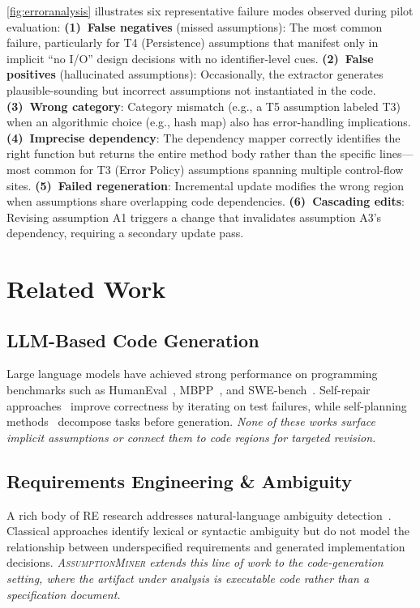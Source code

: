 \documentclass[sigconf,review,anonymous]{acmart}
\newcommand{\sysname}{\textsc{AssumptionMiner}\xspace}
\begin{document}
\cref{fig:erroranalysis} illustrates six representative failure modes observed
during pilot evaluation:
\textbf{(1)~False negatives} (missed assumptions): The most common failure, particularly
for T4 (Persistence) assumptions that manifest only in implicit ``no I/O'' design
decisions with no identifier-level cues.
\textbf{(2)~False positives} (hallucinated assumptions): Occasionally, the extractor
generates plausible-sounding but incorrect assumptions not instantiated in the code.
\textbf{(3)~Wrong category}: Category mismatch (e.g., a T5 assumption labeled T3)
when an algorithmic choice (e.g., hash map) also has error-handling implications.
\textbf{(4)~Imprecise dependency}: The dependency mapper correctly identifies the
right function but returns the entire method body rather than the specific
lines—most common for T3 (Error Policy) assumptions spanning multiple control-flow sites.
\textbf{(5)~Failed regeneration}: Incremental update modifies the wrong region
when assumptions share overlapping code dependencies.
\textbf{(6)~Cascading edits}: Revising assumption A1 triggers a change that
invalidates assumption A3's dependency, requiring a secondary update pass.

\section{Related Work}
\label{sec:related}

\subsection{LLM-Based Code Generation}
Large language models have achieved strong performance on programming benchmarks
such as HumanEval~\cite{chen2021codex}, MBPP~\cite{austin2021mbpp}, and
SWE-bench~\cite{jimenez2024swebench}.
Self-repair approaches~\cite{olausson2023selfrepair,zheng2023selfrefine} improve
correctness by iterating on test failures, while self-planning
methods~\cite{jiang2023selfplanning,dong2023codesurveyllm} decompose tasks before
generation.
\emph{None of these works surface implicit assumptions or connect them to code
regions for targeted revision.}

\subsection{Requirements Engineering \& Ambiguity}
A rich body of RE research addresses natural-language ambiguity
detection~\cite{ferrari2018nlrequire,kiyavitskaya2008ambiguity,ezzini2021nlpre}.
Classical approaches identify lexical or syntactic ambiguity but do not model
the relationship between underspecified requirements and generated implementation
decisions.
\emph{\sysname extends this line of work to the code-generation setting, where
the artifact under analysis is executable code rather than a specification document.}
\end{document}
